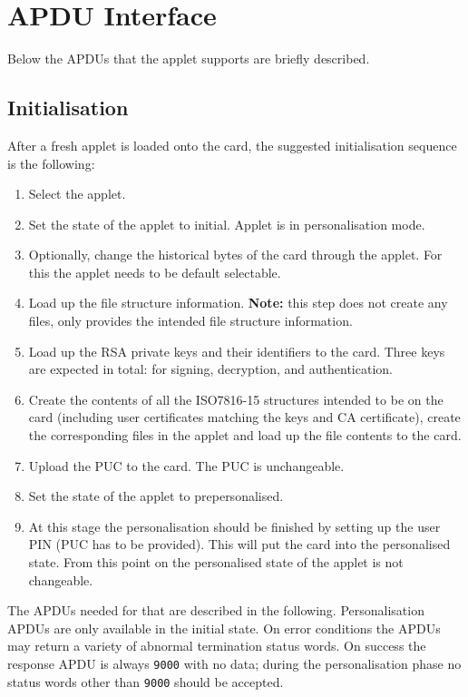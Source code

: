 \documentclass{article}
\begin{document}
\section{APDU Interface}

Below the APDUs that the applet supports are briefly described.

\subsection{Initialisation}

After a fresh applet is loaded onto the card, the suggested
initialisation sequence is the following:
\begin{enumerate}
  \item Select the applet.
  \item Set the state of the applet to \textsf{initial}. Applet is in
    personalisation mode.
  \item Optionally, change the historical bytes of the card through
    the applet. For this the applet needs to be default selectable.
  \item Load up the file structure information. \textbf{Note:} this
    step does not create any files, only provides the intended file
    structure information.
  \item Load up the RSA private keys and their identifiers to the
    card. Three keys are expected in total: for signing, decryption,
    and authentication.
  \item Create the contents of all the ISO7816-15 structures intended
    to be on the card (including user certificates matching the keys
    and CA certificate), create the corresponding files in the applet
    and load up the file contents to the card.
  \item Upload the PUC to the card. The PUC is unchangeable.
  \item Set the state of the applet to \textsf{prepersonalised}.
  \item At this stage the personalisation should be finished by
    setting up the user PIN (PUC has to be provided).  This will put
    the card into the \textsf{personalised} state. From this point on
    the personalised state of the applet is not changeable.
\end{enumerate}

The APDUs needed for that are described in the following.
Personalisation APDUs are only available in the \textsf{initial}
state.  On error conditions the APDUs may return a variety of abnormal
termination status words. On success the response APDU is always
\texttt{9000} with no data; during the personalisation phase no status
words other than \texttt{9000} should be accepted.
\end{document}
